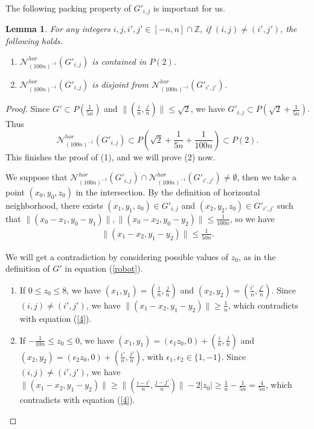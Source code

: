 \documentclass{amsart}
\newtheorem{lem}[thm]{Lemma}
\begin{document}
 The following packing property of $G'_{i,j}$ is important for us.

\begin{lem}\label{packing}
For any integers $i,j,i',j'\in [-n,n]\cap \mathbb{Z}$, if $(i,j)\ne (i',j')$, the following holds.
\begin{enumerate}
\item $\mathcal{N}^{hor}_{(100n)^{-1}}(G'_{i,j})$ is contained in $P(2)$.
\item $\mathcal{N}^{hor}_{(100n)^{-1}}(G'_{i,j})$ is disjoint from $\mathcal{N}^{hor}_{(100n)^{-1}}(G'_{i',j'})$. 
\end{enumerate}
\end{lem}



\begin{proof}
Since $G'\subset P(\frac{1}{5n})$ and $\|(\frac{i}{n},\frac{j}{n})\|\leq \sqrt{2}$, we have $G'_{i,j}\subset P(\sqrt{2}+\frac{1}{5n})$. Thus $$\mathcal{N}^{hor}_{(100n)^{-1}}(G'_{i,j})\subset P(\sqrt{2}+\frac{1}{5n}+\frac{1}{100n})\subset P(2).$$
This finishes the proof of (1), and we will prove (2) now.

We suppose that $\mathcal{N}^{hor}_{(100n)^{-1}}(G'_{i,j})\cap \mathcal{N}^{hor}_{(100n)^{-1}}(G'_{i',j'})\ne \emptyset$, then we take a point $(x_0,y_0,z_0)$ in the intersection. By the definition of horizontal neighborhood, there exists $(x_1,y_1,z_0)\in G'_{i,j}$ and $(x_2,y_2,z_0)\in G'_{i',j'}$ such that $\|(x_0-x_1,y_0-y_1)\|,\|(x_0-x_2,y_0-y_2)\|\leq \frac{1}{100n}$, so we have 
\begin{equation}\label{4}
\begin{aligned}
\|(x_1-x_2,y_1-y_2)\|\leq \frac{1}{50n}.
\end{aligned}
\end{equation}

We will get a contradiction by considering possible values of $z_0$, as in the definition of $G'$ in equation (\ref{robot}).
\begin{enumerate}
\item If $0\leq z_0\leq 8$, we have $(x_1,y_1)=(\frac{i}{n},\frac{j}{n})$ and $(x_2,y_2)=(\frac{i'}{n},\frac{j'}{n})$. Since $(i,j)\ne(i',j')$, we have $\|(x_1-x_2,y_1-y_2)\|\geq\frac{1}{n}$, which contradicts with equation (\ref{4}). 

\item If $-\frac{1}{10n}\leq z_0\leq 0$, we have $(x_1,y_1)=(\epsilon_1 z_0,0)+(\frac{i}{n},\frac{j}{n})$ and $(x_2,y_2)=(\epsilon_2 z_0,0)+(\frac{i'}{n},\frac{j'}{n})$, with $\epsilon_1,\epsilon_2\in \{1,-1\}$. Since $(i,j)\ne(i',j')$, we have $\|(x_1-x_2,y_1-y_2)\|\geq\|(\frac{i-i'}{n},\frac{j-j'}{n})\|-2|z_0|\geq \frac{1}{n}-\frac{1}{5n}=\frac{4}{5n}$, which contradicts with equation (\ref{4}).


\end{enumerate}
\end{proof}
\end{document}

